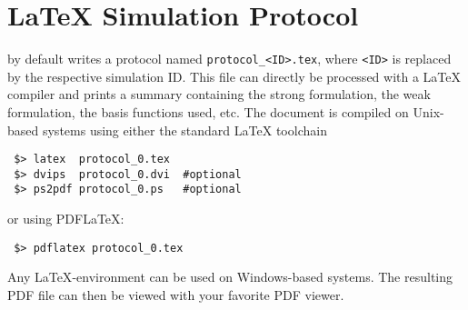 \section{{\LaTeX} Simulation Protocol}
{\ViennaFEM} by default writes a protocol named \lstinline|protocol_<ID>.tex|, where \lstinline|<ID>| is replaced by the respective simulation ID.
This file can directly be processed with a {\LaTeX} compiler and prints a summary containing the strong formulation, the weak formulation, the basis functions used, etc.
The document is compiled on Unix-based systems using either the standard {\LaTeX} toolchain
\begin{lstlisting}
 $> latex  protocol_0.tex
 $> dvips  protocol_0.dvi  #optional
 $> ps2pdf protocol_0.ps   #optional
\end{lstlisting}
or using PDF{\LaTeX}:
\begin{lstlisting}
 $> pdflatex protocol_0.tex
\end{lstlisting}
Any {\LaTeX}-environment can be used on Windows-based systems. The resulting PDF file can then be viewed with your favorite PDF viewer.


